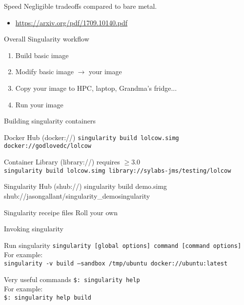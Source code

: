 \documentclass{beamer}
\newcommand{\tty}[1]{\texttt{#1}\xspace}
\begin{document}
  \begin{frame}{Speed}
    Negligible tradeoffs compared to bare metal.
    \begin{itemize}
      \item \url{https://arxiv.org/pdf/1709.10140.pdf}
    \end{itemize}

  \end{frame}

  \begin{frame}{Overall Singularity workflow}
    \begin{enumerate}
      \item Build basic image
      \item Modify basic image $\rightarrow$ your image
      \item Copy your image to HPC, laptop, Grandma's fridge...
      \item Run your image
    \end{enumerate}
  \end{frame}

  \begin{frame}{Building singularity containers}
    \footnotesize
    \begin{block}{Docker Hub (docker://)}
      \tty{singularity build lolcow.simg docker://godlovedc/lolcow}
    \end{block}

    \begin{block}{Container Library  (library://)}
      requires $\ge 3.0$\\
      \tty{singularity build lolcow.simg library://sylabs-jms/testing/lolcow}
    \end{block}
    \begin{block}{Singularity Hub (shub://)}
        {singularity build demo.simg shub://jasongallant/singularity\_demosingularity}
    \end{block}
    \begin{block}{Singularity receipe files}
      Roll your own
    \end{block}
  \end{frame}

  \begin{frame}{Invoking singularity}
    \begin{block}{Run singularity}
      \footnotesize
      \texttt{singularity [global options] command [command options]}\\
      For example:\\
      \texttt{singularity -v build --sandbox /tmp/ubuntu docker://ubuntu:latest}
    \end{block}
    \begin{block}{Very useful commands}
      \texttt{\$: singularity help}\\
      For example:\\
      \texttt{\$: singularity help build}\\
    \end{block}
  \end{frame}
\end{document}
